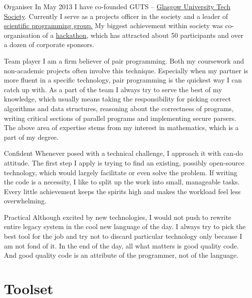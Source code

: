 \documentclass{tccv}
\begin{document}
\begin{skillist}
\item{Organiser} {In May 2013 I have co-founded GUTS -- \href{http://gutechsoc.com}{Glasgow University Tech Society}. Currently I serve as a projects officer in the society and a leader of \href{http://fb.com/groups/scientificProgramming} {scientific programming group.} My biggest achievement within society was co-organisation of a \href{http://storify.com/Eventhread/gu-hackaton}{hackathon}, which has attracted about 50 participants and over a dozen of corporate sponsors.}
\item{Team player} {I am a firm believer of pair programming. Both my coursework and non-academic projects often involve this technique. Especially when my partner is more fluent in a specific technology, pair programming is the quickest way I can catch up with. As a part of the team I always try to serve the best of my knowledge, which usually means taking the responsibility for picking correct algorithms and data structures, reasoning about the correctness of programs, writing critical sections of parallel programs and implementing secure parsers. The above area of expertise stems from my interest in mathematics, which is a part of my degree.}
\item{Confident} {Whenever posed with a technical challenge, I approach it with can-do attitude. The first step I apply is trying to find an existing, possibly open-source technology, which would largely facilitate or even solve the problem. If writing the code is a necessity, I like to split up the work into small, manageable tasks. Every little achievement keeps the spirits high and makes the workload feel less overwhelming.}
\item{Practical} {Although excited by new technologies, I would not push to rewrite entire legacy system in the cool new language of the day. I always try to pick the best tool for the job and try not to discard particular technology only because I am not fond of it. In the end of the day, all what matters is good quality code. And good quality code is an attribute of the programmer, not of the language.}
\end{skillist}


\section{Toolset}
\end{document}
